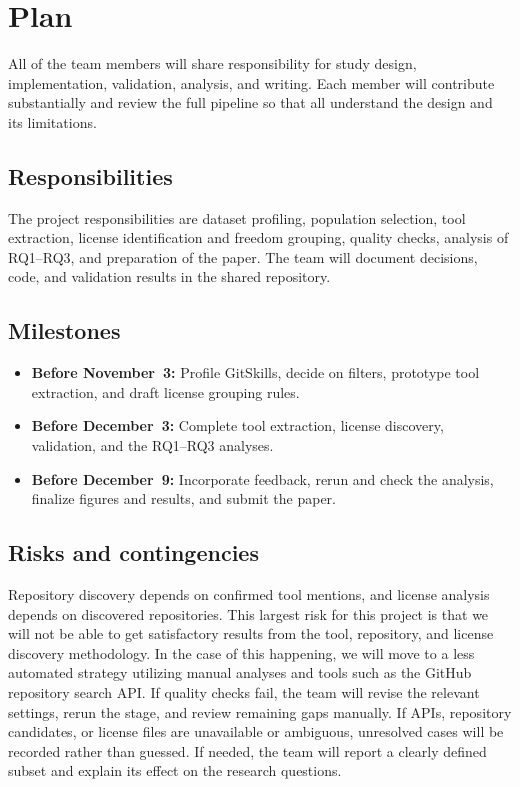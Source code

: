 \section{Plan}

All of the team members will share responsibility for study design, implementation, validation, analysis, and writing.
Each member will contribute substantially and review the full pipeline so that all understand the design and its limitations.

\subsection{Responsibilities}
The project responsibilities are dataset profiling, population selection, tool extraction, license identification and freedom grouping, quality checks, analysis of RQ1--RQ3, and preparation of the paper.
The team will document decisions, code, and validation results in the shared repository.

\subsection{Milestones}
\begin{itemize}
    \item \textbf{Before November~3:} Profile GitSkills, decide on filters, prototype tool extraction, and draft license grouping rules.
    \item \textbf{Before December~3:} Complete tool extraction, license discovery, validation, and the RQ1--RQ3
    analyses.
    \item \textbf{Before December~9:} Incorporate feedback, rerun and check the analysis, finalize figures and results, and submit the paper.
\end{itemize}

\subsection{Risks and contingencies}
Repository discovery depends on confirmed tool mentions, and license analysis depends on discovered repositories.
This largest risk for this project is that we will not be able to get satisfactory results from the tool, repository, and license discovery methodology.
In the case of this happening, we will move to a less automated strategy utilizing manual analyses and tools such as the GitHub repository search API\@.
If quality checks fail, the team will revise the relevant settings, rerun the stage, and review remaining gaps manually.
If APIs, repository candidates, or license files are unavailable or ambiguous, unresolved cases will be recorded rather than guessed.
If needed, the team will report a clearly defined subset and explain its effect on the research questions.
